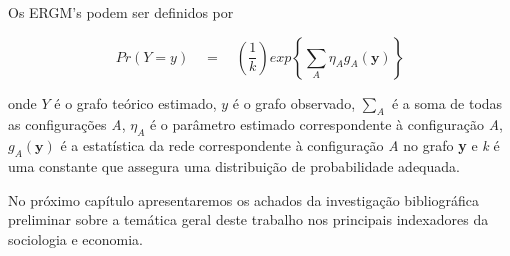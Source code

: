 \documentclass[a4paper, 12pt, openright, oneside, german, french, english, brazil]{abntex2}
\begin{document}
	
	
	Os ERGM's podem ser definidos por
	
	
	\begin{equation}
	Pr(Y=y) \quad = \quad \left(\frac{1}{k}\right) exp \left\{ \sum_{A} \eta_A g_A (\textbf{y}) \right\}
	\end{equation}
	
	onde $Y$ é o grafo teórico estimado, $y$ é o grafo observado, $\sum_{A}$ é a soma de todas as configurações \textit{A}, $\eta_A$ é o parâmetro estimado correspondente à configuração \textit{A}, $g_A(\textbf{y})$ é a estatística da rede correspondente à configuração \textit{A} no grafo \textbf{y} e \textit{k} é uma constante que assegura uma distribuição de probabilidade adequada\cite{robins2007introduction}. 
	
	
	
	
	No próximo capítulo apresentaremos os achados da investigação bibliográfica preliminar sobre a temática geral deste trabalho nos principais indexadores da sociologia e economia.
	
\end{document}

